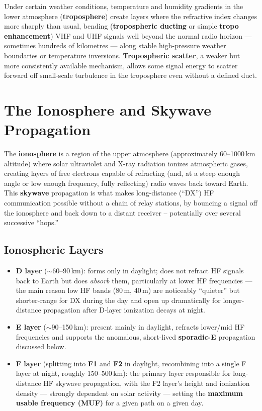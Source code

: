Under certain weather conditions, temperature and humidity gradients in
the lower atmosphere (\textbf{troposphere}) create layers where the
refractive index changes more sharply than usual, bending
(\textbf{tropospheric ducting} or simple \textbf{tropo enhancement}) VHF
and UHF signals well beyond the normal radio horizon --- sometimes
hundreds of kilometres --- along stable high-pressure weather boundaries
or temperature inversions. \textbf{Tropospheric scatter}, a weaker but
more consistently available mechanism, allows some signal energy to
scatter forward off small-scale turbulence in the troposphere even
without a defined duct.

\section{The Ionosphere and Skywave Propagation}

The \textbf{ionosphere} is a region of the upper atmosphere
(approximately 60--1000\,km altitude) where solar ultraviolet and X-ray
radiation ionizes atmospheric gases, creating layers of free electrons
capable of refracting (and, at a steep enough angle or low enough
frequency, fully reflecting) radio waves back toward Earth. This
\textbf{skywave} propagation is what makes long-distance (``DX'') HF
communication possible without a chain of relay stations, by bouncing a
signal off the ionosphere and back down to a distant receiver --
potentially over several successive ``hops.''

\subsection{Ionospheric Layers}

\begin{itemize}
\item \textbf{D layer} (${\sim}60$--90\,km): forms only in daylight;
does not refract HF signals back to Earth but does \emph{absorb} them,
particularly at lower HF frequencies --- the main reason low HF bands
(80\,m, 40\,m) are noticeably ``quieter'' but shorter-range for DX
during the day and open up dramatically for longer-distance
propagation after D-layer ionization decays at night.
\item \textbf{E layer} (${\sim}90$--150\,km): present mainly in
daylight, refracts lower/mid HF frequencies and supports the anomalous,
short-lived \textbf{sporadic-E} propagation discussed below.
\item \textbf{F layer} (splitting into \textbf{F1} and \textbf{F2} in
daylight, recombining into a single F layer at night, roughly
150--500\,km): the primary layer responsible for long-distance HF
skywave propagation, with the F2 layer's height and ionization density
--- strongly dependent on solar activity --- setting the
\textbf{maximum usable frequency (MUF)} for a given path on a given day.
\end{itemize}

